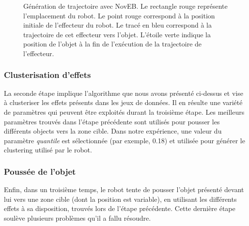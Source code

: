 \documentclass{llncs}
\begin{document}
\begin{figure}[!tbp]
\begin{minipage}[b]{0.4\textwidth}
    \caption{Génération de trajectoire avec NovEB. Le rectangle rouge représente l'emplacement du robot. Le point rouge correspond à la position initiale de l'effecteur du robot. Le tracé en bleu correspond à la trajectoire de cet effecteur vers l'objet. L'étoile verte indique la position de l'objet à la fin de l'exécution de la trajectoire de l'effecteur.}
    \label{fig:ns_traj}
  \end{minipage}
\end{figure}


\subsubsection{Clusterisation d'effets}
La seconde étape implique l'algorithme que nous avons présenté ci-dessus et vise à clusteriser les effets présents dans les jeux de données. Il en résulte une variété de paramètres qui peuvent être exploités durant la troisième étape.
Les meilleurs paramètres trouvés dans l'étape précédente sont utilisés pour pousser les différents objects vers la zone cible. Dans notre expérience, une valeur du paramètre \textit{quantile} est sélectionnée (par exemple, 0.18) et utilisée pour générer le clustering utilisé par le robot.


\subsubsection{Poussée de l'objet}
Enfin, dans un troisième temps, le robot tente de pousser l'objet présenté devant lui vers une zone cible (dont la position est variable), en utilisant les différents effets à sa disposition, trouvés lors de l'étape précédente. Cette dernière étape soulève plusieurs problèmes qu'il a fallu résoudre. 
\end{document}
